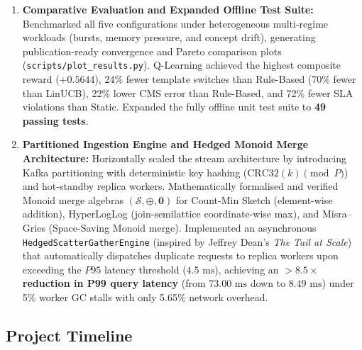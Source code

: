 \begin{enumerate}
    \item \textbf{Comparative Evaluation and Expanded Offline Test Suite:}
    Benchmarked all five configurations under heterogeneous multi-regime workloads (bursts, memory pressure, and concept drift), generating publication-ready convergence and Pareto comparison plots (\texttt{scripts/plot\_results.py}). Q-Learning achieved the highest composite reward ($+0.5644$), 24\% fewer template switches than Rule-Based (70\% fewer than LinUCB), 22\% lower CMS error than Rule-Based, and 72\% fewer SLA violations than Static. Expanded the fully offline unit test suite to \textbf{49 passing tests}.

    \item \textbf{Partitioned Ingestion Engine and Hedged Monoid Merge Architecture:}
    Horizontally scaled the stream architecture by introducing Kafka partitioning with deterministic key hashing ($\text{CRC32}(k) \pmod P$) and hot-standby replica workers. Mathematically formalised and verified Monoid merge algebras $(\mathcal{S}, \oplus, \mathbf{0})$ for Count-Min Sketch (element-wise addition), HyperLogLog (join-semilattice coordinate-wise max), and Misra--Gries (Space-Saving Monoid merge). Implemented an asynchronous \texttt{HedgedScatterGatherEngine} (inspired by Jeffrey Dean's \textit{The Tail at Scale}) that automatically dispatches duplicate requests to replica workers upon exceeding the $P95$ latency threshold ($4.5\text{ ms}$), achieving an \textbf{$>8.5\times$ reduction in P99 query latency} (from $73.00\text{ ms}$ down to $8.49\text{ ms}$) under 5\% worker GC stalls with only 5.65\% network overhead.
\end{enumerate}

\subsection{Project Timeline}

